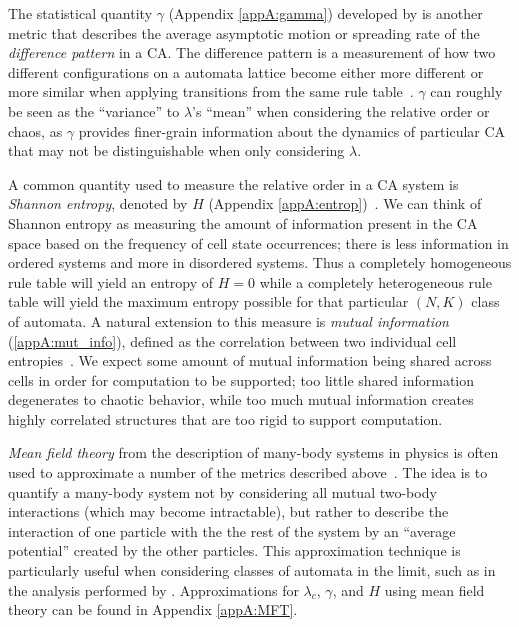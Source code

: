 \documentclass[a4paper,11pt,twoside]{report}
\begin{document}
The statistical quantity $\gamma$ (Appendix \ref{appA:gamma}) developed by \citeauthor{li90b} is another metric that describes the average asymptotic motion or spreading rate of the \textit{difference pattern} in a CA. The difference pattern is a measurement of how two different configurations on a automata lattice become either more different or more similar when applying transitions from the same rule table~\cite{li90b}. $\gamma$ can roughly be seen as the ``variance'' to $\lambda$'s ``mean'' when considering the relative order or chaos, as $\gamma$ provides finer-grain information about the dynamics of particular CA that may not be distinguishable when only considering $\lambda$.

\medskip

A common quantity used to measure the relative order in a CA system is \textit{Shannon entropy}, denoted by $H$ (Appendix \ref{appA:entrop})~\cite{la90,li90a,wo90}. We can think of Shannon entropy as measuring the amount of information present in the CA space based on the frequency of cell state occurrences; there is less information in ordered systems and more in disordered systems. Thus a completely homogeneous rule table will yield an entropy of $H = 0$ while a completely heterogeneous rule table will yield the maximum entropy possible for that particular $(N,K)$ class of automata. A natural extension to this measure is \textit{mutual information} (\ref{appA:mut_info}), defined as the correlation between two individual cell entropies~\cite{la90}. We expect some amount of mutual information being shared across cells in order for computation to be supported; too little shared information degenerates to chaotic behavior, while too much mutual information creates highly correlated structures that are too rigid to support computation.

\medskip

\textit{Mean field theory} from the description of many-body systems in physics is often used to approximate a number of the metrics described above~\cite{li90b,wo90}. The idea is to quantify a many-body system not by considering all mutual two-body interactions (which may become intractable), but rather to describe the interaction of one particle with the the rest of the system by an ``average potential'' created by the other particles. This approximation technique is particularly useful when considering classes of automata in the limit, such as in the analysis performed by \citeauthor{wo90}. Approximations for $\lambda_c$, $\gamma$, and $H$ using mean field theory can be found in Appendix \ref{appA:MFT}.
\end{document}
